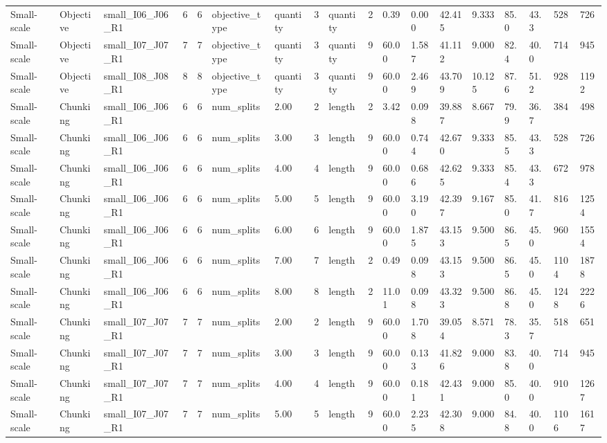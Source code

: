 \begin{longtable}{lllrrllllrllllllll}
Small-scale & Objective & small\_I06\_J06\_R1 & 6 & 6 & objective\_type & quantity & 3 & quantity & 2 & 0.39 & 0.000 & 42.415 & 9.333 & 85.0 & 43.3 & 528 & 726 \\
Small-scale & Objective & small\_I07\_J07\_R1 & 7 & 7 & objective\_type & quantity & 3 & quantity & 9 & 60.00 & 1.587 & 41.112 & 9.000 & 82.4 & 40.0 & 714 & 945 \\
Small-scale & Objective & small\_I08\_J08\_R1 & 8 & 8 & objective\_type & quantity & 3 & quantity & 9 & 60.00 & 2.469 & 43.709 & 10.125 & 87.6 & 51.2 & 928 & 1192 \\
Small-scale & Chunking & small\_I06\_J06\_R1 & 6 & 6 & num\_splits & 2.00 & 2 & length & 2 & 3.42 & 0.098 & 39.887 & 8.667 & 79.9 & 36.7 & 384 & 498 \\
Small-scale & Chunking & small\_I06\_J06\_R1 & 6 & 6 & num\_splits & 3.00 & 3 & length & 9 & 60.00 & 0.744 & 42.670 & 9.333 & 85.5 & 43.3 & 528 & 726 \\
Small-scale & Chunking & small\_I06\_J06\_R1 & 6 & 6 & num\_splits & 4.00 & 4 & length & 9 & 60.00 & 0.686 & 42.625 & 9.333 & 85.4 & 43.3 & 672 & 978 \\
Small-scale & Chunking & small\_I06\_J06\_R1 & 6 & 6 & num\_splits & 5.00 & 5 & length & 9 & 60.00 & 3.190 & 42.397 & 9.167 & 85.0 & 41.7 & 816 & 1254 \\
Small-scale & Chunking & small\_I06\_J06\_R1 & 6 & 6 & num\_splits & 6.00 & 6 & length & 9 & 60.00 & 1.875 & 43.153 & 9.500 & 86.5 & 45.0 & 960 & 1554 \\
Small-scale & Chunking & small\_I06\_J06\_R1 & 6 & 6 & num\_splits & 7.00 & 7 & length & 2 & 0.49 & 0.098 & 43.153 & 9.500 & 86.5 & 45.0 & 1104 & 1878 \\
Small-scale & Chunking & small\_I06\_J06\_R1 & 6 & 6 & num\_splits & 8.00 & 8 & length & 2 & 11.01 & 0.098 & 43.323 & 9.500 & 86.8 & 45.0 & 1248 & 2226 \\
Small-scale & Chunking & small\_I07\_J07\_R1 & 7 & 7 & num\_splits & 2.00 & 2 & length & 9 & 60.00 & 1.708 & 39.054 & 8.571 & 78.3 & 35.7 & 518 & 651 \\
Small-scale & Chunking & small\_I07\_J07\_R1 & 7 & 7 & num\_splits & 3.00 & 3 & length & 9 & 60.00 & 0.133 & 41.826 & 9.000 & 83.8 & 40.0 & 714 & 945 \\
Small-scale & Chunking & small\_I07\_J07\_R1 & 7 & 7 & num\_splits & 4.00 & 4 & length & 9 & 60.00 & 0.181 & 42.431 & 9.000 & 85.0 & 40.0 & 910 & 1267 \\
Small-scale & Chunking & small\_I07\_J07\_R1 & 7 & 7 & num\_splits & 5.00 & 5 & length & 9 & 60.00 & 2.235 & 42.308 & 9.000 & 84.8 & 40.0 & 1106 & 1617 \\

\end{longtable}
